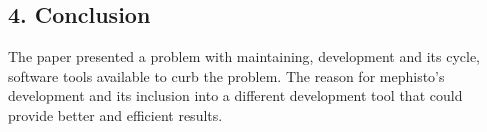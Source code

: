 \documentclass[a4paper,10pt]{article}
\begin{document}
\begin{multicols}{2}
\section*{\normalsize 4. Conclusion}
The paper presented a problem with maintaining, development and its cycle, software tools available to
curb the problem. The reason for mephisto's development and its inclusion into a different development 
tool that could provide better and efficient results. 

\end{multicols}

%  
%
\end{document}
